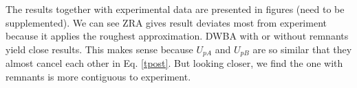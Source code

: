 The results together with experimental data are presented in figures (need to be supplemented). 
We can see ZRA gives result deviates most from experiment because it applies the roughest approximation.
DWBA with or without remnants yield close results.
This makes sense because $U_{pA}$ and $U_{pB}$ are so similar that they almost cancel each other in Eq. \ref{tpost}.
But looking closer, we find the one with remnants is more contiguous to experiment.
